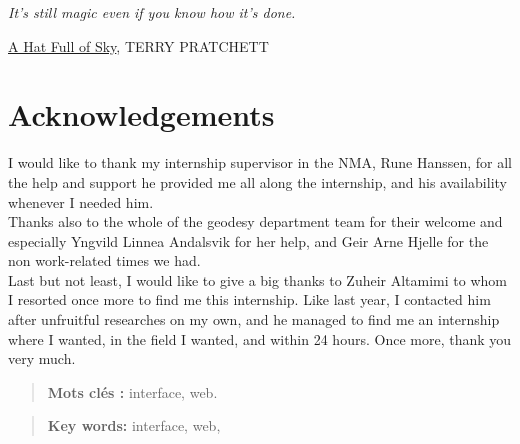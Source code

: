 \documentclass{themeensg}
\newlength\longest
\begin{document}
\clearpage

\thispagestyle{empty}
\null\vfill

\settowidth{}
\begin{center}
\parbox{\longest}{
  \raggedright{\huge\itshape
  It's still magic even if you know how it's done.\par\bigskip
  }
  \raggedleft\Large\underline{A Hat Full of Sky}\MakeUppercase{, Terry Pratchett}\par%
}
\end{center}
\vfill\vfill

\clearpage

\newevenpage
\chapter*{Acknowledgements}

I would like to thank my internship supervisor in the NMA, Rune Hanssen, for all the help and support he provided me all along the internship, and his availability whenever I needed him.\\

Thanks also to the whole of the geodesy department team for their welcome and especially Yngvild Linnea Andalsvik for her help, and Geir Arne Hjelle for the non work-related times we had.\\

Last but not least, I would like to give a big thanks to Zuheir Altamimi to whom I resorted once more to find me this internship. Like last year, I contacted him after unfruitful researches on my own, and he managed to find me an internship where I wanted, in the field I wanted, and within 24 hours. Once more, thank you very much.

\begin{abstract}
\thispagestyle{empty}
	\vspace{1cm}

	
	
	\vspace{1.5cm}
	
	\textbf{Mots clés :} interface, web.
\end{abstract}


\begin{abstract}
\thispagestyle{empty}
	\vspace{1cm}
	
	
	\vspace{1.5cm}
	
	\textbf{Key words:} interface, web, 
\end{abstract}
\end{document}
